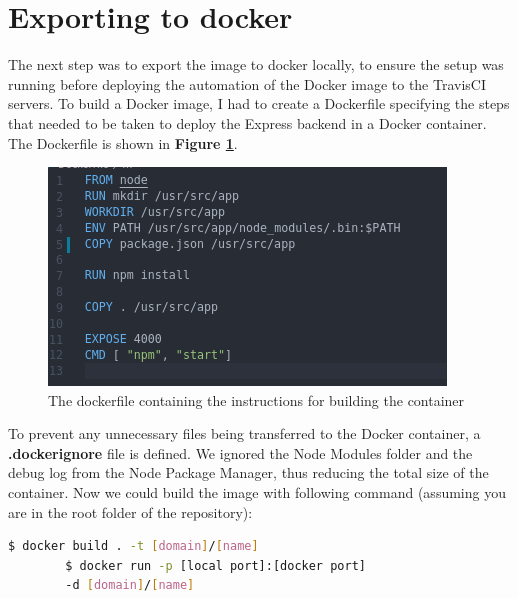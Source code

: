 \documentclass{paper}
\begin{document}
    \section{Exporting to docker}{
    The next step was to export the image to docker locally, to ensure the setup was
    running before deploying the automation of the Docker image to the TravisCI servers. To build a Docker image, I had to create
    a Dockerfile specifying the steps that needed to be taken to deploy the Express backend in a Docker container. The Dockerfile
    is shown in \textbf{Figure \ref{fig:dockerfile}}.
    \begin{figure}[!h]
        \centering
        \includegraphics[scale=3, pagebox=artbox]{Images/Dockerfile.png}
        \caption{The dockerfile containing the instructions for building the container}
        \label{fig:dockerfile}
    \end{figure}
    \newline
    To prevent any unnecessary files being transferred to the Docker container, a \textbf{.dockerignore} file is defined.
    We ignored the Node Modules folder and the debug log from the Node Package Manager, thus reducing the total size of 
    the container. Now we could build the image with following command (assuming you are in the root folder of the repository):
    \begin{lstlisting}[language=bash]
        $ docker build . -t [domain]/[name]
        $ docker run -p [local port]:[docker port] 
        -d [domain]/[name]
    \end{lstlisting}
    }    
    \newpage

\end{document}
